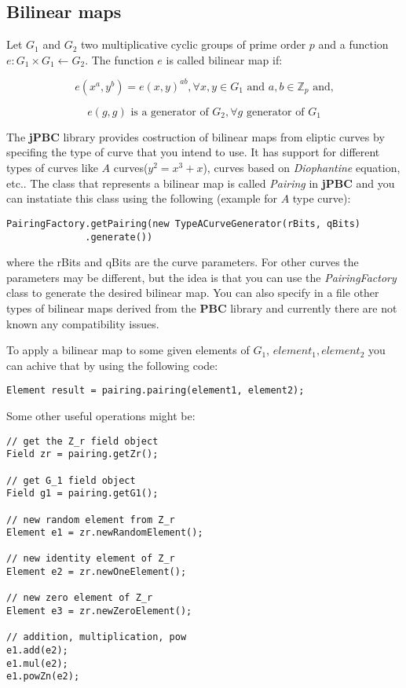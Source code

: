 \documentclass[12pt]{article}
\begin{document}
\subsection{Bilinear maps}

Let $G_1$ and $G_2$ two multiplicative cyclic groups of prime order $p$ and a function $e : G_1 \times G_1 \leftarrow G_2$. The function $e$ is called bilinear map if:

$$e(x^a, y^b) = e(x, y)^{ab}, \forall x, y \in G_1 \textrm{ and } a, b \in \mathbb{Z}_p \textrm{ and,}$$

$$e(g, g) \textrm{ is a generator of } G_2, \forall g \textrm{ generator of } G_1$$

The \textbf{jPBC} library provides costruction of bilinear maps from eliptic curves by specifing the type of curve that you intend to use. It has support for different types of curves like $A$ curves($y^2 = x^3 + x$), curves based on \textit{Diophantine} equation, etc.. The class that represents a bilinear map is called \textit{Pairing} in \textbf{jPBC} and you can instatiate this class using the following (example for $A$ type curve):

\begin{lstlisting}
PairingFactory.getPairing(new TypeACurveGenerator(rBits, qBits)
			  .generate())
\end{lstlisting} 

where the rBits and qBits are the curve parameters. For other curves the parameters may be different, but the idea is that you can use the \textit{PairingFactory} class to generate the desired bilinear map. You can also specify in a file other types of bilinear maps derived from the \textbf{PBC} library and currently there are not known any compatibility issues.

To apply a bilinear map to some given elements of $G_1$, $element_1, element_2$ you can achive that by using the following code:

\begin{lstlisting}
Element result = pairing.pairing(element1, element2);
\end{lstlisting} 

Some other useful operations might be:

\begin{lstlisting}
// get the Z_r field object
Field zr = pairing.getZr();

// get G_1 field object
Field g1 = pairing.getG1();

// new random element from Z_r
Element e1 = zr.newRandomElement();

// new identity element of Z_r
Element e2 = zr.newOneElement();

// new zero element of Z_r
Element e3 = zr.newZeroElement();

// addition, multiplication, pow
e1.add(e2);
e1.mul(e2);
e1.powZn(e2);
\end{lstlisting} 
\end{document}
